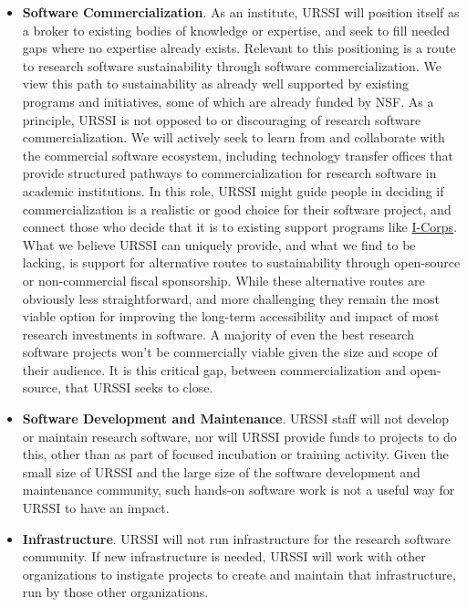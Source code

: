 \documentclass[
]{book}
\begin{document}
\begin{itemize}
\item
  \textbf{Software Commercialization}. As an institute, URSSI will position
  itself as a broker to existing bodies of knowledge or expertise, and
  seek to fill needed gaps where no expertise already exists. Relevant
  to this positioning is a route to research software sustainability through
  software commercialization. We view this path to sustainability
  as already well supported by existing programs and initiatives, some of
  which are already funded by NSF. As a principle, URSSI is not opposed
  to or discouraging of research software commercialization. We will actively
  seek to learn from and collaborate with the commercial software ecosystem,
  including technology transfer offices that provide structured pathways to
  commercialization for research software in academic institutions. In this
  role, URSSI might guide people in deciding if commercialization is a
  realistic or good choice for their software project, and connect those who
  decide that it is to existing support programs like
  \href{https://www.nsf.gov/news/special_reports/i-corps/}{I-Corps}. What we believe
  URSSI can uniquely provide, and what we find to be lacking, is support for
  alternative routes to sustainability through open-source or non-commercial
  fiscal sponsorship. While these alternative routes are obviously less
  straightforward, and more challenging they remain the most viable option for
  improving the long-term accessibility and impact of most research
  investments in software. A majority of even the best research software projects
  won't be commercially viable given the size and scope of their audience. It is
  this critical gap, between commercialization and open-source, that URSSI seeks
  to close.
\item
  \textbf{Software Development and Maintenance}. URSSI staff will not develop or
  maintain research software, nor will URSSI provide funds to projects to do this,
  other than as part of focused incubation or training activity. Given the small size
  of URSSI and the large size of the software development and maintenance community,
  such hands-on software work is not a useful way for URSSI to have an impact.
\item
  \textbf{Infrastructure}. URSSI will not run infrastructure for the research software
  community. If new infrastructure is needed, URSSI will work with other organizations
  to instigate projects to create and maintain that infrastructure, run by those other
  organizations.
\end{itemize}
\end{document}
